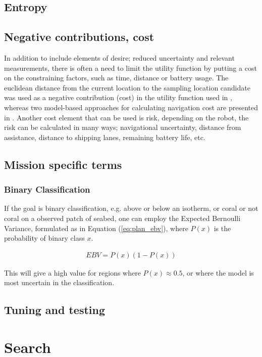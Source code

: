 \subsection{Entropy}
\subsection{Negative contributions, cost}
In addition to include elements of desire; reduced uncertainty and relevant measurements, there is often a need to limit the utility function by putting a cost on the constraining factors, such as time, distance or battery usage. The euclidean distance from the current location to the sampling location candidate was used as a negative contribution (cost) in the utility function used in \cite{berget2018adaptive}, whereas two model-based approaches for calculating navigation cost are presented in \cite{stankiewicz2021adaptive}. Another cost element that can be used is risk, depending on the robot, the risk can be calculated in many ways; navigational uncertainty, distance from assistance, distance to shipping lanes, remaining battery life, etc.  


\subsection{Mission specific terms}

\subsubsection{Binary Classification}
If the goal is binary classification, e.g. above or below an isotherm, or coral or not coral on a observed patch of seabed, one can employ the Expected Bernoulli Variance, formulated as in Equation (\ref{eq:plan_ebv}), where $P(x)$ is the probability of binary class $x$. 

\begin{align}
    \label{eq:plan_ebv}
    EBV = P(x)(1-P(x))
\end{align}

This will give a high value for regions where $P(x)\approx 0.5$, or where the model is most uncertain in the classification. 



\subsection{Tuning and testing}

\section{Search}

